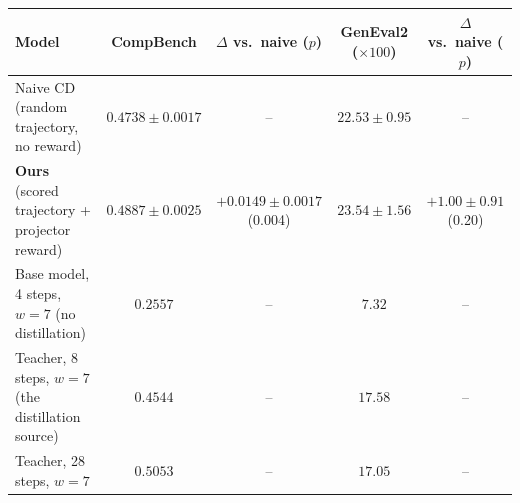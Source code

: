 \begin{tabular}{l c c c c}
\toprule
Model & CompBench & $\Delta$ vs.\ naive ($p$) & GenEval2 ($\times100$) & $\Delta$ vs.\ naive ($p$) \\
\midrule
Naive CD (random trajectory, no reward) & $0.4738\pm0.0017$ & -- & $22.53\pm0.95$ & -- \\
\textbf{Ours} (scored trajectory + projector reward) & $\mathbf{0.4887}\pm0.0025$ & $+0.0149\pm0.0017$ (0.004) & $\mathbf{23.54}\pm1.56$ & $+1.00\pm0.91$ (0.20) \\
\midrule
Base model, 4 steps, $w{=}7$ (no distillation) & $0.2557$ & -- & $7.32$ & -- \\
Teacher, 8 steps, $w{=}7$ (the distillation source) & $0.4544$ & -- & $17.58$ & -- \\
Teacher, 28 steps, $w{=}7$ & $0.5053$ & -- & $17.05$ & -- \\
\bottomrule
\end{tabular}
